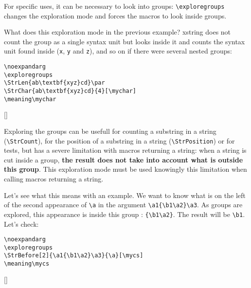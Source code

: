 \documentclass[a4paper,10pt]{article}
\newcommand\US{syntax unit\xspace}
\newcommand\Xstring{\textsf{xstring}\xspace}
\newcommand\styleexercice{\footnotesize}
\newcommand\verbinline{\lstinline[basicstyle=\normalsize\ttfamily]}
\begin{document}
For specific uses, it can be necessary to look into groups: \verbinline|\exploregroups| changes the exploration mode and forces the macros to look inside groups.\medskip

What does this exploration mode in the previous example? \Xstring does not count the group as a single \US but looks inside it and counts the \US found inside (\verb|x|, \verb|y| and \verb|z|), and so on if there were several nested groups:\smallskip

\nobreak\smallskip
\begin{minipage}[c]{0.65\linewidth}
\begin{lstlisting}
\noexpandarg
\exploregroups
\StrLen{ab\textbf{xyz}cd}\par
\StrChar{ab\textbf{xyz}cd}{4}[\mychar]
\meaning\mychar
\end{lstlisting}%
\end{minipage}\hfill
\begin{minipage}[c]{0.35\linewidth}
	\styleexercice
	\noexpandarg
	\exploregroups
	\par
	[\mychar]
	\meaning\mychar
\end{minipage}%
\fullexpandarg\noexploregroups
\medskip

Exploring the groups can be usefull for counting a substring in a string (\verbinline|\StrCount|), for the position of a substring in a string (\verbinline|\StrPosition|) or for tests, but has a severe limitation with macros returning a string: when a string is cut inside a group, \textbf{the result does not take into account what is outside this group}. This exploration mode must be used knowingly this limitation when calling macros returning a string.\smallskip

Let's see what this means with an example. We want to know what is on the left of the second appearance of \verb|\a| in the argument \verb|\a1{\b1\a2}\a3|. As groups are explored, this appearance is inside this group : \verb|{\b1\a2}|. The result will be \verb|\b1|. Let's check:\par\nobreak\smallskip
\begin{minipage}[c]{0.65\linewidth}
\begin{lstlisting}
\noexpandarg
\exploregroups
\StrBefore[2]{\a1{\b1\a2}\a3}{\a}[\mycs]
\meaning\mycs
\end{lstlisting}%
\end{minipage}\hfill
\begin{minipage}[c]{0.35\linewidth}
	\styleexercice
	\noexpandarg
	\exploregroups
	[\mycs]
	\meaning\mycs
\end{minipage}%
\medskip
\end{document}
